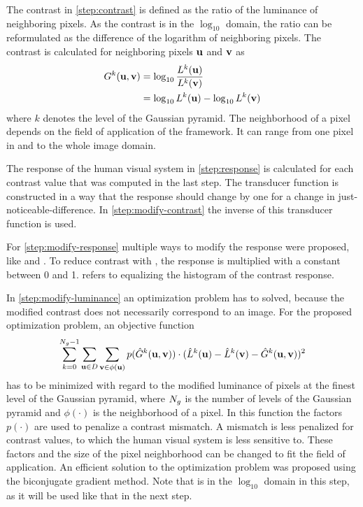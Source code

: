 The contrast in \ref{step:contrast} is defined as the ratio of the luminance of neighboring pixels.
As the contrast is in the $\log_{10}$ domain, the ratio can be reformulated as the difference of the logarithm of neighboring pixels.
The contrast is calculated for neighboring pixels $\mathbf{u}$ and $\mathbf{v}$ as 
\begin{align}
	\label{eq:contrast}
	G^k (\mathbf{u}, \mathbf{v}) &= \log_{10} \frac{L^k (\mathbf{u})}{L^k (\mathbf{v})} \\
	&= \log_{10} L^k (\mathbf{u}) - \log_{10} L^k (\mathbf{v}) \nonumber
\end{align}
where $k$ denotes the level of the Gaussian pyramid.
The neighborhood of a pixel depends on the field of application of the framework.
It can range from one pixel in \xdir{} and \ydirection{} to the whole image domain.

The response of the human visual system in \ref{step:response} is calculated for each contrast value that was computed in the last step.
The transducer function is constructed in a way that the response should change by one for a change in just\hyp{}noticeable\hyp{}difference.
In \ref{step:modify-contrast} the inverse of this transducer function is used.

For \ref{step:modify-response} multiple ways to modify the response were proposed, like  and .
To reduce contrast with , the response is multiplied with a constant between 0 and 1.
 refers to equalizing the histogram of the contrast response. 

In \ref{step:modify-luminance} an optimization problem has to solved, because the modified contrast does not necessarily correspond to an image.
For the proposed optimization problem, an objective function
\begin{align}
\label{eq:optimization-problem}
\sum_{k=0}^{N_g-1} \sum_{\mathbf{u} \in D} \sum_{\mathbf{v} \in \phi(\mathbf{u})} p (\hat{G}^k (\mathbf{u}, \mathbf{v}) ) \cdot ( \hat{L}^k (\mathbf{u}) - \hat{L}^k (\mathbf{v}) - \hat{G}^k (\mathbf{u}, \mathbf{v}) )^2
\end{align}
has to be minimized with regard to the modified luminance \modifiedluminance{} of pixels at the finest level of the Gaussian pyramid, where $N_g$ is the number of levels of the Gaussian pyramid and $\phi(\cdot)$ is the neighborhood of a pixel.
In this function the factors $p(\cdot)$ are used to penalize a contrast mismatch. 
A mismatch is less penalized for contrast values, to which the human visual system is less sensitive to.
These factors and the size of the pixel neighborhood can be changed to fit the field of application.
An efficient solution to the optimization problem was proposed using the biconjugate gradient method.
Note that \modifiedluminance{} is in the $\log_{10}$ domain in this step, as it will be used like that in the next step.

